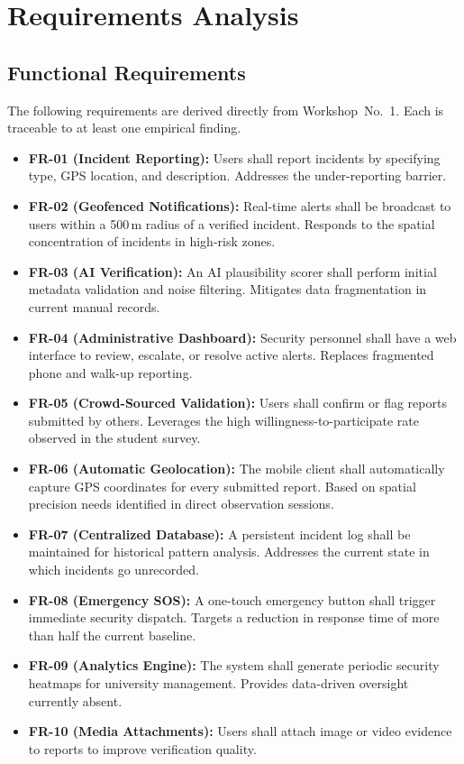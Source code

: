\documentclass[10pt,twocolumn]{article}
\begin{document}
\section{Requirements Analysis}

\subsection{Functional Requirements}

The following requirements are derived directly from Workshop~No.~1.
Each is traceable to at least one empirical finding.

\begin{itemize}[leftmargin=*, itemsep=1pt, topsep=2pt]
\item \textbf{FR-01 (Incident Reporting):} Users shall report incidents
by specifying type, GPS location, and description. Addresses the
under-reporting barrier.
\item \textbf{FR-02 (Geofenced Notifications):} Real-time alerts shall
be broadcast to users within a 500\,m radius of a verified incident.
Responds to the spatial concentration of incidents in high-risk zones.
\item \textbf{FR-03 (AI Verification):} An AI plausibility scorer shall
perform initial metadata validation and noise filtering. Mitigates data
fragmentation in current manual records.
\item \textbf{FR-04 (Administrative Dashboard):} Security personnel
shall have a web interface to review, escalate, or resolve active alerts.
Replaces fragmented phone and walk-up reporting.
\item \textbf{FR-05 (Crowd-Sourced Validation):} Users shall confirm or
flag reports submitted by others. Leverages the high
willingness-to-participate rate observed in the student survey.
\item \textbf{FR-06 (Automatic Geolocation):} The mobile client shall
automatically capture GPS coordinates for every submitted report. Based
on spatial precision needs identified in direct observation sessions.
\item \textbf{FR-07 (Centralized Database):} A persistent incident log
shall be maintained for historical pattern analysis. Addresses the
current state in which incidents go unrecorded.
\item \textbf{FR-08 (Emergency SOS):} A one-touch emergency button shall
trigger immediate security dispatch. Targets a reduction in response
time of more than half the current baseline.
\item \textbf{FR-09 (Analytics Engine):} The system shall generate
periodic security heatmaps for university management. Provides
data-driven oversight currently absent.
\item \textbf{FR-10 (Media Attachments):} Users shall attach image or
video evidence to reports to improve verification quality.
\end{itemize}
\end{document}
